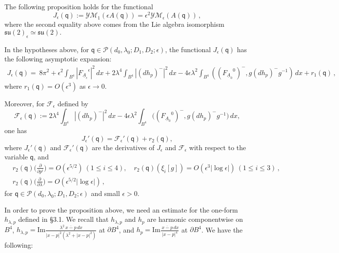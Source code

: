 \documentclass[11pt]{article}
\numberwithin{equation}{section} \setlength{\topmargin}{-35pt}
\newcommand{\PP}{\mathcal{P}}
\newcommand{\q}{\mathsf{q}}
\begin{document}
\medskip
\noindent The following proposition holds for the functional
\begin{equation}
\label{3.3} J_{\epsilon}(\q):= \mathcal{YM}_1(\epsilon
A(\q))=\epsilon^2\mathcal{YM}_{\epsilon}(A(\q))\,,
\end{equation}
where the second equality above comes from the Lie algebra
isomorphism $\mathfrak{su}(2)_\epsilon\simeq\mathfrak{su}(2).$
\begin{proposition}
\label{P3.1} In the hypotheses above, for $\q\in
\PP(d_0,\lambda_0;D_1,D_2;\epsilon)$, the functional
$J_{\epsilon}(\q)$ has the following asymptotic expansion:
\begin{align}
\label{J-epsilon}
J_{\epsilon}(\q)=~8\pi^2+\epsilon^2\int_{B^4}|{F_{\underline{A}_{\epsilon}}}^{\epsilon}|^2\,dx
+2\lambda^4\int_{B^4}|(dh_p)^-|^2\,dx
-4\epsilon\lambda^2\int_{B^4}(({F_{\underline{A}_0}}^0)^-,g(dh_p)^-g^{-1})\,dx
+r_1(\q)\,,
\end{align}
where $r_1(\q)=O(\epsilon^3)$ as $\epsilon\to 0$.

\noindent Moreover, for $\mathcal{F}_{\epsilon}$  defined by
$$
\mathcal{F}_{\epsilon}(\q):=2\lambda^4\int_{B^4}|(dh_p)^-|^2\,dx-4\epsilon\lambda^2\int_{B^4}
\bigl(({F_{\underline{A}_0}}^0)^-,g(dh_p)^-g^{-1}\bigr)\,dx,
$$
one has
$$J_{\epsilon}'(\q)=\mathcal{F}_{\epsilon}'(\q)+r_2(\q),$$
where $J_{\epsilon}'(\q)$ and $\mathcal{F}_{\epsilon}'(\q)$ are the
derivatives of $J_{\epsilon}$ and $\mathcal{F}_{\epsilon}$ with
respect to the variable $\q$, and
\begin{align}
&r_2(\q)\Big(\frac{\partial}{\partial
p^i}\Big)=O(\epsilon^{5/2})~(1\le i\le 4),\quad r_2(\q)(\xi_i[g])=O(\epsilon^3|\log\epsilon|)~(1\le i\le 3)\,,\label{3.5}\\
&r_2(\q)\Big(\frac{\partial}{\partial\lambda}\Big)=O(\epsilon^{5/2}|\log\epsilon|)\,,\label{3.6}
\end{align}
for $\q\in \PP(d_0,\lambda_0;D_1,D_2;\epsilon)$ and small
$\epsilon>0$.
\end{proposition}
In order to prove the proposition above, we need an estimate for the
one-form $h_{\lambda,p}$ defined in \S3.1. We recall that
$h_{\lambda,p}$ and $h_p$ are harmonic componentwise on $B^4$,
$h_{\lambda,p}=\text{Im}\frac{\lambda^2\,\overline{x-p}\,dx}{|x-p|^2(\lambda^2+|x-p|^2)}$
at $\partial B^4$,  and
$h_p=\text{Im}\frac{\,\overline{x-p}\,dx}{|x-p|^4}$ at $\partial
B^4$. We have the following:
\end{document}
